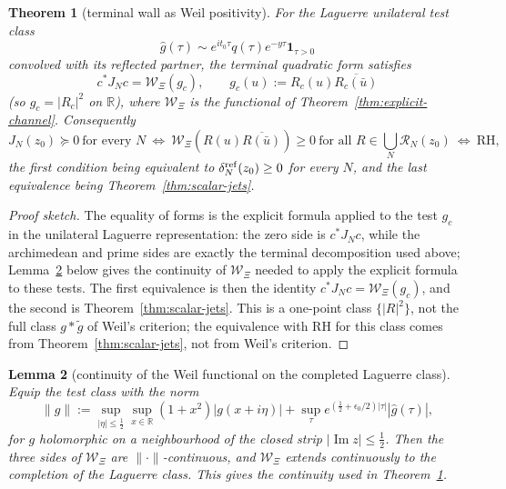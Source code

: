 \documentclass[11pt]{amsart}
\newtheorem{theorem}{Theorem}[section]
\newtheorem{lemma}[theorem]{Lemma}
\theoremstyle{definition}
\theoremstyle{remark}
\theoremstyle{definition}
\renewcommand{\Im}{\operatorname{Im}}
\newcommand{\half}{\tfrac{1}{2}}
\newcommand{\R}{\mathbb{R}}
\begin{document}
\begin{theorem}[terminal wall as Weil positivity]\label{thm:wall-weil}
For the Laguerre unilateral test class
\[
   \widehat g(\tau)\sim e^{it_0\tau}q(\tau)e^{-y\tau}\mathbf 1_{\tau>0}
\]
convolved with its reflected partner, the terminal quadratic form satisfies
\[
   c^*J_Nc=\mathcal W_\Xi(g_c),\qquad g_c(u):=R_c(u)\overline{R_c(\bar u)}
\]
(so $g_c=|R_c|^2$ on $\R$), where $\mathcal W_\Xi$ is the functional of
Theorem~\ref{thm:explicit-channel}.  Consequently
\[
   J_N(z_0)\succeq0\ \text{for every }N
   \ \Longleftrightarrow\
   \mathcal W_\Xi(R(u)\overline{R(\bar u)})\ge0\ \text{for all }R\in\textstyle\bigcup_N\mathcal R_N(z_0)
   \ \Longleftrightarrow\
   \mathrm{RH},
\]
the first condition being equivalent to $\delta_N^{\rm ref}(z_0)\ge0$ for every $N$, and the last
equivalence being Theorem~\ref{thm:scalar-jets}.
\end{theorem}

\begin{proof}[Proof sketch]
The equality of forms is the explicit formula applied to the test $g_c$ in the unilateral
Laguerre representation: the zero side is $c^*J_Nc$, while the archimedean and prime sides are exactly
the terminal decomposition used above; Lemma~\ref{lem:weil-continuity} below gives the continuity of
$\mathcal W_\Xi$ needed to apply the explicit formula to these tests.  The first equivalence is then the identity
$c^*J_Nc=\mathcal W_\Xi(g_c)$, and the second is Theorem~\ref{thm:scalar-jets}.  This is a one-point class
$\{|R|^2\}$, not the full class $g*\tilde g$ of Weil's criterion; the equivalence with RH for this
class comes from Theorem~\ref{thm:scalar-jets}, not from Weil's criterion.
\end{proof}

\begin{lemma}[continuity of the Weil functional on the completed Laguerre class]\label{lem:weil-continuity}
Equip the test class with the norm
\[
   \|g\|:=\sup_{|\eta|\le\half}\sup_{x\in\R}(1+x^2)|g(x+i\eta)|
   +\sup_\tau e^{(\half+\epsilon_0/2)|\tau|}|\widehat g(\tau)|,
\]
for $g$ holomorphic on a neighbourhood of the closed strip $|\Im z|\le\half$.  Then the three sides of
$\mathcal W_\Xi$ are $\|\cdot\|$-continuous, and $\mathcal W_\Xi$ extends continuously to the completion of the Laguerre class.
This gives the continuity used in Theorem~\ref{thm:wall-weil}.
\end{lemma}
\end{document}
